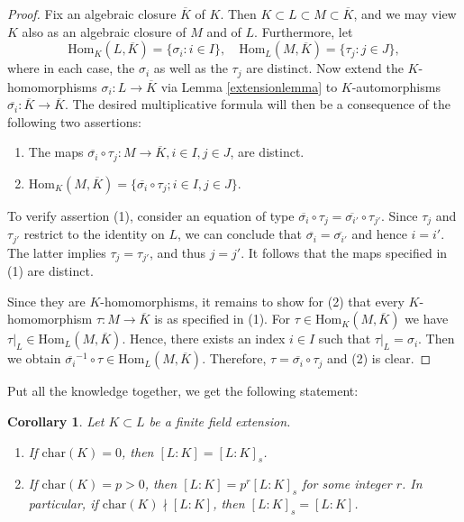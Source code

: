 \documentclass[12pt]{report}
\newtheorem{cor}[thm]{Corollary}
\theoremstyle{definition}
\def\Hom{\text{Hom}}
\def\char{\text{char}}
\begin{document}
\begin{proof}
    Fix an algebraic closure $\overline{K}$ of $K$. Then $K \subset L \subset M \subset \overline{K}$, and we may view $K$ also as an algebraic closure of $M$ and of $L$. Furthermore, let
    $$\Hom_K(L,\overline{K}) = \{\sigma_i: i \in I\},\quad \Hom_L(M,\overline{K}) = \{\tau_j: j \in J\},$$ where in each case, the $\sigma_i$ as well as the $\tau_j$ are distinct. Now extend the $K$-homomorphisms $\sigma_i : L \to \overline{K}$ via Lemma \ref{extensionlemma} to $K$-automorphisms $\overline{\sigma_i}: \overline{K} \to \overline{K}$. 
    The desired multiplicative formula will then be a consequence of the following two assertions:
    \begin{enumerate}
        \item The maps $\overline{\sigma_i} \circ \tau_j : M \to \overline{K}, i \in I, j \in J$, are distinct.
        \item $\Hom_K(M,\overline{K}) = \{\overline{\sigma_i} \circ \tau_j ; i \in I, j \in J\}.$
    \end{enumerate}
    
    To verify assertion (1), consider an equation of type $\overline{\sigma_i} \circ \tau_j = \overline{\sigma_{i'}} \circ \tau_{j'}$. Since $\tau_j$ and $\tau_{j'}$ restrict to the identity on $L$, we can conclude that $\overline{\sigma_i} = \overline{\sigma_{i'}}$ and hence $i = i'$. The latter implies $\tau_j = \tau_{j'}$, and thus $j = j'$. It follows that the maps specified in (1) are distinct.
    
    Since they are  $K$-homomorphisms, it remains to show for (2) that every $K$-homomorphism $\tau : M \to \overline{K}$ is as specified in (1). For $\tau \in \Hom_K(M,\overline{K})$ we have $\tau|_L \in \Hom_L(M,\overline{K})$. Hence, there exists an index $i \in I$ such that $\tau|_L = \sigma_i$. Then we obtain $\overline{\sigma_i}^{-1}\circ\tau \in \Hom_L(M,\overline{K})$. Therefore, $\tau=\overline{\sigma_i}\circ \tau_j$ and (2) is clear.
\end{proof}

Put all the knowledge together, we get the following statement:

\begin{cor}
    Let $K \subset L$ be a finite field extension.
    \begin{enumerate}
        \item If $\char(K) = 0$, then $[L : K] = [L : K]_s$.
        \item If $\char(K) = p > 0$, then $[L : K] = p^r[L : K]_s$ for some integer $r$. In particular, if $\char(K)\nmid [L:K]$, then $[L : K]_s = [L : K]$.
    \end{enumerate}
\end{cor}
\end{document}
